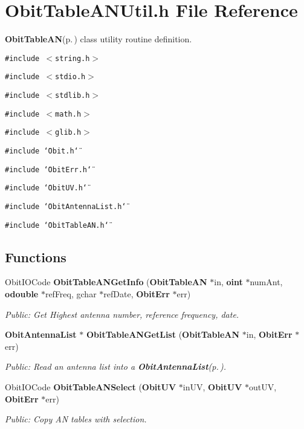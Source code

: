 \section{Obit\-Table\-ANUtil.h File Reference}
\label{ObitTableANUtil_8h}
{\bf Obit\-Table\-AN}{\rm (p.\,\pageref{structObitTableAN})} class utility routine definition. 

{\tt \#include $<$string.h$>$}\par
{\tt \#include $<$stdio.h$>$}\par
{\tt \#include $<$stdlib.h$>$}\par
{\tt \#include $<$math.h$>$}\par
{\tt \#include $<$glib.h$>$}\par
{\tt \#include \char`\"{}Obit.h\char`\"{}}\par
{\tt \#include \char`\"{}Obit\-Err.h\char`\"{}}\par
{\tt \#include \char`\"{}Obit\-UV.h\char`\"{}}\par
{\tt \#include \char`\"{}Obit\-Antenna\-List.h\char`\"{}}\par
{\tt \#include \char`\"{}Obit\-Table\-AN.h\char`\"{}}\par
\subsection*{Functions}
\begin{CompactItemize}
\item 
Obit\-IOCode {\bf Obit\-Table\-ANGet\-Info} ({\bf Obit\-Table\-AN} $\ast$in, {\bf oint} $\ast$num\-Ant, {\bf odouble} $\ast$ref\-Freq, gchar $\ast$ref\-Date, {\bf Obit\-Err} $\ast$err)
\begin{CompactList}\small\item\em Public: Get Highest antenna number, reference frequency, date. \item\end{CompactList}\item 
{\bf Obit\-Antenna\-List} $\ast$ {\bf Obit\-Table\-ANGet\-List} ({\bf Obit\-Table\-AN} $\ast$in, {\bf Obit\-Err} $\ast$err)
\begin{CompactList}\small\item\em Public: Read an antenna list into a {\bf Obit\-Antenna\-List}{\rm (p.\,\pageref{structObitAntennaList})}. \item\end{CompactList}\item 
Obit\-IOCode {\bf Obit\-Table\-ANSelect} ({\bf Obit\-UV} $\ast$in\-UV, {\bf Obit\-UV} $\ast$out\-UV, {\bf Obit\-Err} $\ast$err)
\begin{CompactList}\small\item\em Public: Copy AN tables with selection. \item\end{CompactList}\end{CompactItemize}


